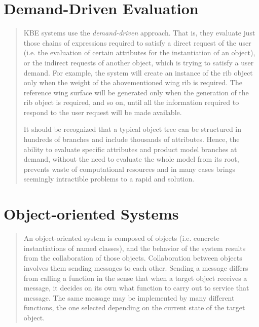 \documentclass [11pt]{book}
\begin{document}
\section{Demand-Driven Evaluation}

\label{sec:demand-drivenevaluation}



\begin{quote}
KBE systems use the \emph{demand-driven} approach. That is, they evaluate just those chains of
expressions required to satisfy a direct request of the user (i.e. the
evaluation of certain attributes for the instantiation of an object),
or the indirect requests of another object, which is trying to satisfy
a user demand. For example, the system will create an instance of the
rib object only when the weight of the abovementioned wing rib is
required. The reference wing surface will be generated only when the
generation of the rib object is required, and so on, until all the
information required to respond to the user request will be made
available.

It should be recognized that a typical object tree can be structured
in hundreds of branches and include thousands of attributes. Hence,
the ability to evaluate specific attributes and product model branches
at demand, without the need to evaluate the whole model from its root,
prevents waste of computational resources and in many cases brings
seemingly intractible problems to a rapid and solution.

\end{quote}


\section{Object-oriented Systems}

\label{sec:object-orientedsystems}



\begin{quote}
An object-oriented system is composed of
       objects (i.e. concrete instantiations of named classes), and
       the behavior of the system results from the collaboration of
       those objects. Collaboration between objects involves them
       sending messages to each other. Sending a message differs from
       calling a function in the sense that when a target object
       receives a message, it decides on its own what function to
       carry out to service that message. The same message may be
       implemented by many different functions, the one selected
       depending on the current state of the target object.

\end{quote}
\end{document}

